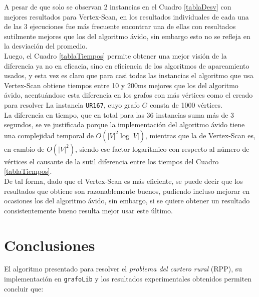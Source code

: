 \documentclass[11pt]{article}
\begin{document}
A pesar de que solo se observan 2 instancias en el Cuadro
\ref{tablaDesv} con mejores resultados para Vertex-Scan, en
los resultados individuales de cada una de las 3 ejecuciones
fue más frecuente encontrar una de ellas con resultados sutilmente
mejores que los del algoritmo ávido, sin embargo esto no se
refleja en la desviación del promedio. \\

Luego, el Cuadro \ref{tablaTiempos} permite obtener una
mejor visión de la diferencia ya no en eficacia, sino en
eficiencia de los algoritmos de apareamiento usados, y esta 
vez es claro que para casi todas las instancias el algoritmo
que usa Vertex-Scan obtiene tiempos entre 10 y 200ms mejores
que los del algoritmo ávido, acentuándose esta diferencia en
los grafos con más vértices como el creado para resolver La
instancia \texttt{UR167}, cuyo grafo $G$ consta de 1000 vértices. \\

La diferencia en tiempo, que en total para las 36 instancias
suma más de 3 segundos, se ve justificada porque la implementación
del algoritmo ávido tiene una complejidad temporal de $O(|V|^2\log|V|)$,
mientras que la de Vertex-Scan es, en cambio de $O(|V|^2)$, siendo
ese factor logarítmico con respecto al número de vértices el causante
de la sutil diferencia entre los tiempos del Cuadro \ref{tablaTiempos}. \\

De tal forma, dado que el Vertex-Scan es más eficiente, se puede
decir que los resultados que obtiene son razonablemente buenos,
pudiendo incluso mejorar en ocasiones los del algoritmo ávido,
sin embargo, si se quiere obtener un resultado consistentemente
bueno resulta mejor usar este último.

\section{Conclusiones}

El algoritmo presentado para resolver el \emph{problema del cartero rural} (RPP),
su implementación en \texttt{grafoLib} y los resultados 
experimentales obtenidos permiten concluir que:
\end{document}
